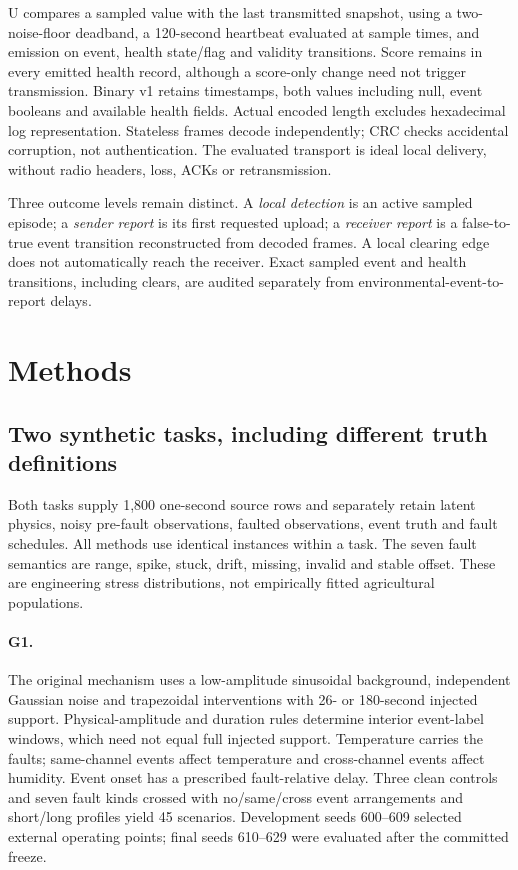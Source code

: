 \documentclass[10pt]{article}
\begin{document}
U compares a sampled value with the last transmitted snapshot, using a two-noise-floor deadband, a 120-second heartbeat evaluated at sample times, and emission on event, health state/flag and validity transitions. Score remains in every emitted health record, although a score-only change need not trigger transmission. Binary v1 retains timestamps, both values including null, event booleans and available health fields. Actual encoded length excludes hexadecimal log representation. Stateless frames decode independently; CRC checks accidental corruption, not authentication. The evaluated transport is ideal local delivery, without radio headers, loss, ACKs or retransmission.

Three outcome levels remain distinct. A \emph{local detection} is an active sampled episode; a \emph{sender report} is its first requested upload; a \emph{receiver report} is a false-to-true event transition reconstructed from decoded frames. A local clearing edge does not automatically reach the receiver. Exact sampled event and health transitions, including clears, are audited separately from environmental-event-to-report delays.

\section{Methods}
\subsection{Two synthetic tasks, including different truth definitions}
Both tasks supply 1,800 one-second source rows and separately retain latent physics, noisy pre-fault observations, faulted observations, event truth and fault schedules. All methods use identical instances within a task. The seven fault semantics are range, spike, stuck, drift, missing, invalid and stable offset. These are engineering stress distributions, not empirically fitted agricultural populations.

\paragraph{G1.}
The original mechanism uses a low-amplitude sinusoidal background, independent Gaussian noise and trapezoidal interventions with 26- or 180-second injected support. Physical-amplitude and duration rules determine interior event-label windows, which need not equal full injected support. Temperature carries the faults; same-channel events affect temperature and cross-channel events affect humidity. Event onset has a prescribed fault-relative delay. Three clean controls and seven fault kinds crossed with no/same/cross event arrangements and short/long profiles yield 45 scenarios. Development seeds 600--609 selected external operating points; final seeds 610--629 were evaluated after the committed freeze.
\end{document}
